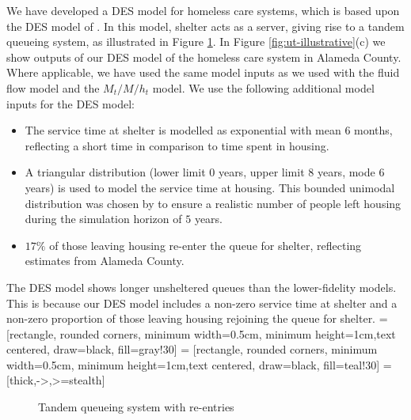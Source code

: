 \documentclass[12pt,a4paper]{article}
\begin{document}
We have developed a DES model for homeless care systems, which is based upon the DES model of \cite{singham2023discrete}. In this model, shelter acts as a server, giving rise to a tandem queueing system, as illustrated in Figure \ref{fig:des-q}. In Figure \ref{fig:ut-illustrative}(c) we show outputs of our DES model of the homeless care system in Alameda County. Where applicable, we have used the same model inputs as we used with the fluid flow model and the $M_t/M/h_t$ model. We use the following additional model inputs for the DES model:
%
\begin{itemize} [noitemsep]
\item The service time at shelter is modelled as exponential with mean $6$ months, reflecting a short time in comparison to time spent in housing.
\item A triangular distribution (lower limit $0$ years, upper limit $8$ years, mode $6$ years) is used to model the service time at housing. This bounded unimodal distribution was chosen by \cite{singham2023discrete} to ensure a realistic number of people left housing during the simulation horizon of $5$ years. 
\item $17\%$ of those leaving housing re-enter the queue for shelter, reflecting estimates from Alameda County.
\end{itemize}
%
 The DES model shows longer unsheltered queues than the lower-fidelity models. This is because our DES model includes a non-zero service time at shelter and a non-zero proportion of those leaving housing rejoining the queue for shelter. 
%
 = [rectangle, rounded corners, minimum width=0.5cm, minimum height=1cm,text centered, draw=black, fill=gray!30]
 = [rectangle, rounded corners, minimum width=0.5cm, minimum height=1cm,text centered, draw=black, fill=teal!30]
 = [thick,->,>=stealth]
%
\begin{figure}
  \begin{center}
    \caption{Tandem queueing system with re-entries} \label{fig:des-q}
  \end{center}
\end{figure}
\end{document}

